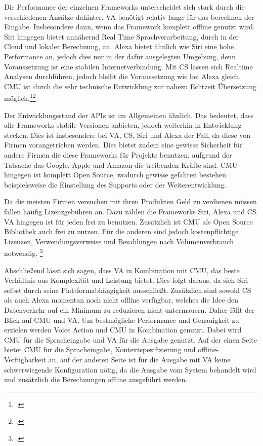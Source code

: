 Die Performance der einzelnen Frameworks unterscheidet sich stark durch die verschiedenen Ansätze dahinter. \ac{VA} benötigt relativ lange für das berechnen der Eingabe. Insbesondere dann, wenn das Framework komplett offline genutzt wird. Siri hingegen bietet annähernd Real Time Sprachverarbeitung, durch in der Cloud und lokaler Berechnung, an. Alexa bietet ähnlich wie Siri eine hohe Performance an, jedoch dies nur in der dafür ausgelegten Umgebung, denn Voraussetzung ist eine stabilen Internetverbindung. Mit \ac{CS} lassen sich Realtime Analysen durchführen, jedoch bleibt die Voraussetzung wie bei Alexa gleich. \ac{CMU} ist durch die sehr technische Entwicklung zur nahezu Echtzeit Übersetzung möglich.\footcite[vgl.:][]{howSiriWork}\footcite[vgl.:][S. 3 f.]{sirivsgoogleSpeech}

Der Entwicklungsstand der \ac{API}s ist im Allgemeinen ähnlich. Das bedeutet, dass alle Frameworks stabile Versionen anbieten, jedoch weiterhin in Entwicklung stecken. Dies ist insbesondere bei \ac{VA}, \ac{CS}, Siri und Alexa der Fall, da diese von Firmen vorangetrieben werden. Dies bietet zudem eine gewisse Sicherheit für andere Firmen die diese Frameworks für Projekte benutzen, aufgrund der Tatsache das Google, Apple und Amazon die treibenden Kräfte sind. \ac{CMU} hingegen ist komplett Open Source, wodurch gewisse gefahren bestehen beispielsweise die Einstellung des Supports oder der Weiterentwicklung.

Da die meisten Firmen versuchen mit ihren Produkten Geld zu verdienen müssen fallen häufig Lizenzgebühren an. Dazu zählen die Frameworks Siri, Alexa und \ac{CS}. \ac{VA} hingegen ist für jeden frei zu benutzen. Zusätzlich ist \ac{CMU} als Open Source Bibliothek auch frei zu nutzen. Für die anderen sind jedoch kostenpflichtige Lizenzen, Verwendungsverweise und Bezahlungen nach Volumenverbrauch notwendig.
\footcite[vgl.:][]{CMUSphinx}

Abschließend lässt sich sagen, dass \ac{VA} in Kombination mit \ac{CMU}, das beste Verhältnis aus Komplexität und Leistung bietet. Dies folgt daraus, da sich Siri selbst durch  seine Plattformabhängigkeit ausschließt. Zusätzlich sind sowohl \ac{CS} als auch Alexa momentan noch nicht offline verfügbar, welches die Idee den Datenverkehr auf ein Minimum zu reduzieren nicht untermauern. Daher fällt der Blick auf \ac{CMU} und \ac{VA}. Um bestmögliche Performance und Genauigkeit zu erzielen werden Voice Action und \ac{CMU} in Kombination genutzt. Dabei wird \ac{CMU} für die Spracheingabe und \ac{VA} für die Ausgabe genutzt. Auf der einen Seite bietet \ac{CMU} für die Spracheingabe, Kontextspezifizierung und offline-Verfügbarkeit an, auf der anderen Seite ist für die Ausgabe mit \ac{VA} keine schwerwiegende Konfiguration nötig, da die Ausgabe vom System behandelt wird und zusätzlich die Berechnungen offline ausgeführt werden.


